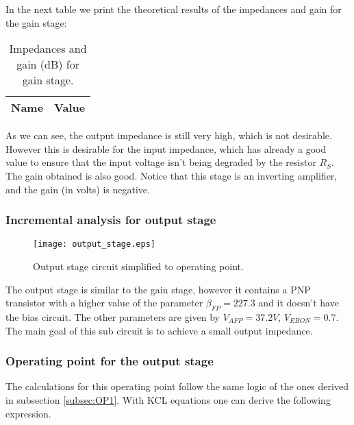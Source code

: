 \par In the next table we print the theoretical results of the impedances and gain for the gain stage:

 \begin{table}[H]
    \centering
    \begin{tabular}{|l|r|}
    \hline    
    {\bf Name} & {\bf Value} \\ \hline
    
    \end{tabular}
     \caption{Impedances and gain (dB) for gain stage.}
    \label{tab:inc1}
  \end{table}
 
 \par As we can see, the output impedance is still very high, which is not desirable. However this is desirable for the input impedance, which has already a good value to ensure that the input voltage isn't being degraded by the resistor $R_S$. The gain obtained is also good. Notice that this stage is an inverting amplifier, and the gain (in volts) is negative.
 
\subsubsection{Incremental analysis for output stage}
\label{subsec:op2}

 \begin{figure}[H] \centering
\texttt{[image: output\_stage.eps]}
\caption{Output stage circuit simplified to operating point.}
\label{fig:output_stage}
\end{figure}
 
 
 \par The output stage is similar to the gain stage, however it contains a PNP transistor with a higher value of the parameter $\beta _{FP}=227.3$ and it doesn't have the bias circuit. The other parameters are given by $V_{AFP}=37.2V$, $V_{EBON}=0.7$. The main goal of this sub circuit is to achieve a small output impedance.
 
\subsubsection{Operating point for the output stage}

\par The calculations for this operating point follow the same logic of the ones derived in subsection \ref{subsec:OP1}. With KCL equations one can derive the following expression.

